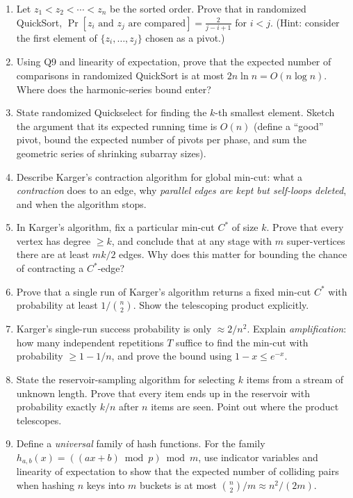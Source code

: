 \documentclass[11pt]{article}
\begin{document}
\begin{enumerate}[label=\textbf{A\arabic*.}, leftmargin=2.2em]
\item Let $z_1 < z_2 < \cdots < z_n$ be the sorted order. Prove that in randomized
QuickSort, $\Pr[z_i \text{ and } z_j \text{ are compared}] = \frac{2}{j - i + 1}$ for
$i < j$. (Hint: consider the first element of $\{z_i, \ldots, z_j\}$ chosen as a pivot.)

\item Using Q9 and linearity of expectation, prove that the expected number of comparisons
in randomized QuickSort is at most $2n\ln n = O(n\log n)$. Where does the harmonic-series
bound enter?

\item State randomized Quickselect for finding the $k$-th smallest element. Sketch the
argument that its expected running time is $O(n)$ (define a ``good'' pivot, bound the
expected number of pivots per phase, and sum the geometric series of shrinking subarray
sizes).

\item Describe Karger's contraction algorithm for global min-cut: what a \emph{contraction}
does to an edge, why \emph{parallel edges are kept but self-loops deleted}, and when the
algorithm stops.

\item In Karger's algorithm, fix a particular min-cut $C^*$ of size $k$. Prove that every
vertex has degree $\ge k$, and conclude that at any stage with $m$ super-vertices there are
at least $mk/2$ edges. Why does this matter for bounding the chance of contracting a
$C^*$-edge?

\item Prove that a single run of Karger's algorithm returns a fixed min-cut $C^*$ with
probability at least $1/\binom{n}{2}$. Show the telescoping product explicitly.

\item Karger's single-run success probability is only $\approx 2/n^2$. Explain
\emph{amplification}: how many independent repetitions $T$ suffice to find the min-cut with
probability $\ge 1 - 1/n$, and prove the bound using $1 - x \le e^{-x}$.

\item State the reservoir-sampling algorithm for selecting $k$ items from a stream of
unknown length. Prove that every item ends up in the reservoir with probability exactly
$k/n$ after $n$ items are seen. Point out where the product telescopes.

\item Define a \emph{universal} family of hash functions. For the family $h_{a,b}(x) =
((ax+b)\bmod p)\bmod m$, use indicator variables and linearity of expectation to show that
the expected number of colliding pairs when hashing $n$ keys into $m$ buckets is at most
$\binom{n}{2}/m \approx n^2/(2m)$.


\end{enumerate}
\end{document}

